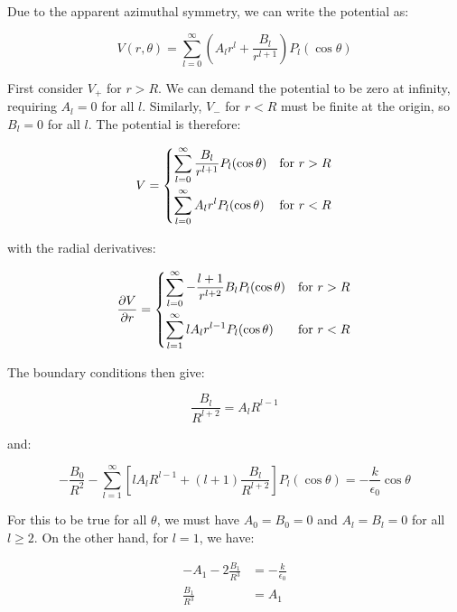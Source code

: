 \documentclass[12pt]{article}
\begin{document}
Due to the apparent azimuthal symmetry, we can write the potential as:

\begin{equation}
    V(r, \theta) = \sum_{l=0}^{\infty} \left( A_{l} r^{l} + \frac{B_{l}}{r^{l+1}} \right) P_{l}(\cos{\theta})
\end{equation}

First consider $V_{+}$ for $r > R$. We can demand the potential to be zero at infinity, requiring $A_{l} = 0$ for all $l$. Similarly, $V_{-}$ for $r < R$ must be finite at the origin, so $B_{l} = 0$ for all $l$. The potential is therefore:

\begin{equation}
V =
\begin{dcases}
    \sum_{l=0}^{\infty} \frac{B_{l}}{r^{l+1}} P_{l}(\cos{\theta}) & \text{for } r > R \\
    \sum_{l=0}^{\infty} A_{l} r^{l} P_{l}(\cos{\theta}) & \text{for } r < R
\end{dcases}
\end{equation}

with the radial derivatives:

\begin{equation}
\frac{\partial V}{\partial r} =
\begin{dcases}
    \sum_{l=0}^{\infty} -\frac{l+1}{r^{l+2}} B_{l} P_{l}(\cos{\theta}) & \text{for } r > R \\
    \sum_{l=1}^{\infty} l A_{l} r^{l-1} P_{l}(\cos{\theta}) & \text{for } r < R
\end{dcases}
\end{equation}

The boundary conditions then give:

\begin{equation}
\frac{B_{l}}{R^{l+2}} = A_{l} R^{l-1}
\end{equation}

and:

\begin{equation}
-\frac{B_{0}}{R^{2}} - \sum_{l=1}^{\infty} \left[ l A_{l} R^{l-1} + (l + 1)\frac{B_{l}}{R^{l+2}} \right] P_{l}(\cos{\theta}) = -\frac{k}{\epsilon_{0}} \cos{\theta}
\end{equation}

For this to be true for all $\theta$, we must have $A_{0} = B_{0} = 0$ and $A_{l} = B_{l} = 0$ for all $l \ge 2$. On the other hand, for $l = 1$, we have:

\begin{equation}
\begin{split}
    -A_{1} - 2\frac{B_{1}}{R^{3}} &= -\frac{k}{\epsilon_{0}} \\
    \frac{B_{1}}{R^{3}} &= A_{1}
\end{split}
\end{equation}
\end{document}
